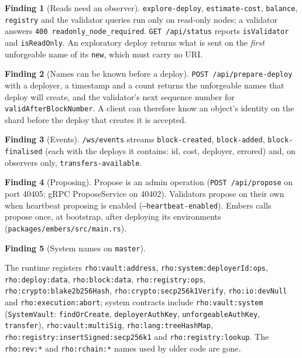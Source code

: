 \documentclass[11pt]{article}
\theoremstyle{definition}
\newtheorem{finding}{Finding}
\theoremstyle{remark}
\newcommand{\code}[1]{\texttt{#1}}
\newcommand{\Em}{Embers}
\begin{document}
\begin{finding}[Reads need an observer]\label{f:observer}
\code{explore-deploy}, \code{estimate-cost}, \code{balance}, \code{registry} and the
validator queries run only on read-only nodes; a validator answers
\code{400 readonly\_node\_required}. \code{GET /api/status} reports
\code{isValidator} and \code{isReadOnly}. An exploratory deploy returns what is sent
on the \emph{first} unforgeable name of its \code{new}, which must carry no URI.
\end{finding}

\begin{finding}[Names can be known before a deploy]\label{f:prepare}
\code{POST /api/prepare-deploy} with a deployer, a timestamp and a count returns the
unforgeable names that deploy will create, and the validator's next sequence number
for \code{validAfterBlockNumber}. A client can therefore know an object's identity on
the shard before the deploy that creates it is accepted.
\end{finding}

\begin{finding}[Events]\label{f:events}
\code{/ws/events} streams \code{block-created}, \code{block-added},
\code{block-finalised} (each with the deploys it contains: id, cost, deployer,
errored) and, on observers only, \code{transfers-available}.
\end{finding}

\begin{finding}[Proposing]\label{f:propose}
Propose is an admin operation (\code{POST /api/propose} on port 40405; gRPC
ProposeService on 40402). Validators propose on their own when heartbeat proposing is
enabled (\code{--heartbeat-enabled}). \Em{} calls propose once, at bootstrap, after
deploying its environments (\code{packages/embers/src/main.rs}).
\end{finding}

\begin{finding}[System names on \code{master}]\label{f:urns}
\raggedright
The runtime registers \code{rho:vault:address}, \code{rho:system:deployerId:ops},
\code{rho:deploy:data}, \code{rho:block:data}, \code{rho:registry:ops},
\code{rho:crypto:blake2b256Hash}, \code{rho:crypto:secp256k1Verify},
\code{rho:io:devNull} and \code{rho:execution:abort}; system contracts include
\code{rho:vault:system} (\code{SystemVault}: \code{findOrCreate},
\code{deployerAuthKey}, \code{unforgeableAuthKey}, \code{transfer}),
\code{rho:vault:multiSig}, \code{rho:lang:treeHashMap},
\code{rho:registry:insertSigned:secp256k1} and \code{rho:registry:lookup}. The
\code{rho:rev:*} and \code{rho:rchain:*} names used by older code are gone.
\end{finding}
\end{document}
